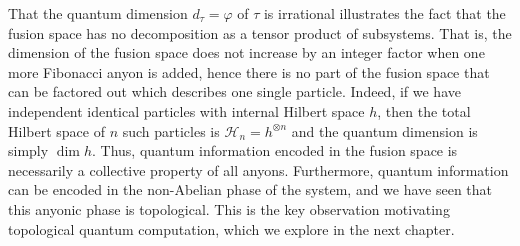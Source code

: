 \documentclass[a4paper,10pt,oneside]{book}
\theoremstyle{plain}
\newtheorem{proposition}[theorem]{Proposition}
\theoremstyle{definition}
\theoremstyle{remark}
\begin{document}
That the quantum dimension $d_τ = φ$ of $τ$ is irrational illustrates the fact that the fusion space has no decomposition as a tensor product of subsystems. That is, the dimension of the fusion space does not increase by an integer factor when one more Fibonacci anyon is added, hence there is no part of the fusion space that can be factored out which describes one single particle. Indeed, if we have independent identical particles with internal Hilbert space $h$, then the total Hilbert space of $n$ such particles is $\mathcal{H}_n = h^{⊗n}$ and the quantum dimension is simply $\dim h$. Thus, quantum information encoded in the fusion space is necessarily a collective property of all anyons. Furthermore, quantum information can be encoded in the non-Abelian phase of the system, and we have seen that this anyonic phase is topological. This is the key observation motivating topological quantum computation, which we explore in the next chapter.



\end{document}
